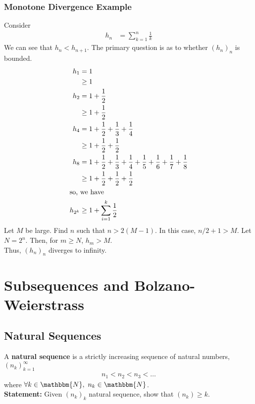 \documentclass[10pt]{extarticle}
\newcommand{\N}{\mathbbm{N}}
\begin{document}
    \subsubsection{Monotone Divergence Example}%
    Consider
    \begin{align*}
      h_n &= \sum_{k=1}^{n} \frac{1}{k}
    \end{align*}
    We can see that $h_{n} < h_{n+1}$. The primary question is as to whether $(h_n)_n$ is bounded.
    \begin{align*}
      h_{1} &= 1 \\&\geq 1\\
      h_{2} &= 1 + \frac{1}{2}\\ &\geq 1 + \frac{1}{2}\\
      h_{4} &= 1 + \frac{1}{2} + \frac{1}{3} + \frac{1}{4}\\ &\geq 1 + \frac{1}{2} + \frac{1}{2}\\
      h_{8} &= 1 + \frac{1}{2} + \frac{1}{3} + \frac{1}{4} + \frac{1}{5} + \frac{1}{6} + \frac{1}{7} + \frac{1}{8}\\
            &\geq 1 + \frac{1}{2}  + \frac{1}{2} + \frac{1}{2}\\
            \shortintertext{so, we have}
      h_{2^k} &\geq 1 + \sum_{i=1}^{k}\frac{1}{2}\\
    \end{align*}
    Let $M$ be large. Find $n$ such that $n > 2(M-1)$. In this case, $n/2 + 1 > M$. Let $N = 2^n$. Then, for $m \geq N$, $h_{m} > M$.\\

    Thus, $(h_n)_n$ diverges to infinity.
  \section{Subsequences and Bolzano-Weierstrass}%
  \subsection{Natural Sequences}%
    A \textbf{natural sequence} is a strictly increasing sequence of natural numbers, $(n_{k})_{k=1}^{\infty}$
    \begin{align*}
      n_{1} < n_2 < n_3<\dots
    \end{align*}
    where $\forall k\in\N,~n_k\in\N$.\\
    
    \textbf{Statement:} Given $(n_k)_k$ natural sequence, show that $(n_k) \geq k$.\\
\end{document}
